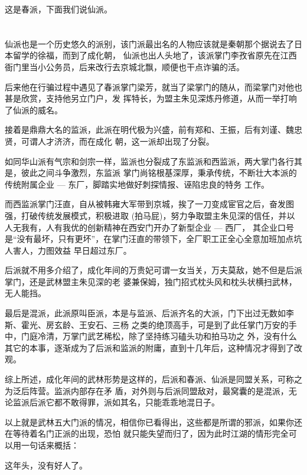 \documentclass[11pt,a4paper,onecolumn]{article}
\begin{document}
这是春派，下面我们说仙派。

\section[\thesection]{}

仙派也是一个历史悠久的派别，该门派最出名的人物应该就是秦朝那个据说去了日本留学的徐福，而到了成化朝，
仙派也出人头地了，该派掌门李孜省原先在江西衙门里当小公务员，后来改行去京城北飘，顺便也干点诈骗的活。

后来他在行骗过程中遇见了春派掌门梁芳，就当了梁掌门的随从，而梁掌门对他也甚是欣赏，支持他另立门户，发
挥特长，为盟主朱见深炼丹修道，从而一举打响了仙派的威名。

接着是鼎鼎大名的监派，此派在明代极为兴盛，前有郑和、王振，后有刘谨、魏忠贤，可谓人才济济，而在成化
朝，这一派却出现了分裂。

如同华山派有气宗和剑宗一样，监派也分裂成了东监派和西监派，两大掌门各行其是，彼此之间斗争激烈，东监派
掌门尚铭根基深厚，秉承传统，不断壮大本派的传统附属企业 --- 东厂，脚踏实地做好刺探情报、诬陷忠良的特务
工作。

而西监派掌门汪直，自从被韩雍大军带到京城，挨了一刀变成宦官之后，奋发图强，打破传统发展模式，积极进取
(拍马屁)，努力争取盟主朱见深的信任，并以人无我有，人有我优的创新精神在西安门开办了新型企业 --- 西厂，
其企业口号是``没有最坏，只有更坏''，在掌门汪直的带领下，全厂职工正全心全意加班加点坑人害人，力图效益
早日超过东厂。

后派就不用多介绍了，成化年间的万贵妃可谓一女当关，万夫莫敌，她不但是后派掌门，还是武林盟主朱见深的老
婆兼保姆，独门招式枕头风和枕头状横扫武林，无人能挡。

最后是混派，此派原叫臣派，本是与监派、后派齐名的大派，门下出过无数如李斯、霍光、房玄龄、王安石、三杨
之类的绝顶高手，可是到了此任掌门万安的手中，门庭冷清，万掌门武艺稀松，除了坚持练习磕头功和拍马功之
外，没有什么其它的本事，逐渐成为了后派和监派的附庸，直到十几年后，这种情况才得到了改观。

综上所述，成化年间的武林形势是这样的，后派和春派、仙派是同盟关系，可称之为泛后阵营。监派内部存在矛
盾，对外则与后派同盟敌对，最窝囊的是混派，无论监派后派它都不敢得罪，派如其名，只能乖乖地混日子。

以上就是武林五大门派的情况，相信你已看得出，这些都是所谓的邪派，如果你还在等待着名门正派的出现，恐怕
就只能失望而归了，因为此时江湖的情形完全可以用一句话来概括：

这年头，没有好人了。

\section[\thesection]{}
\end{document}
